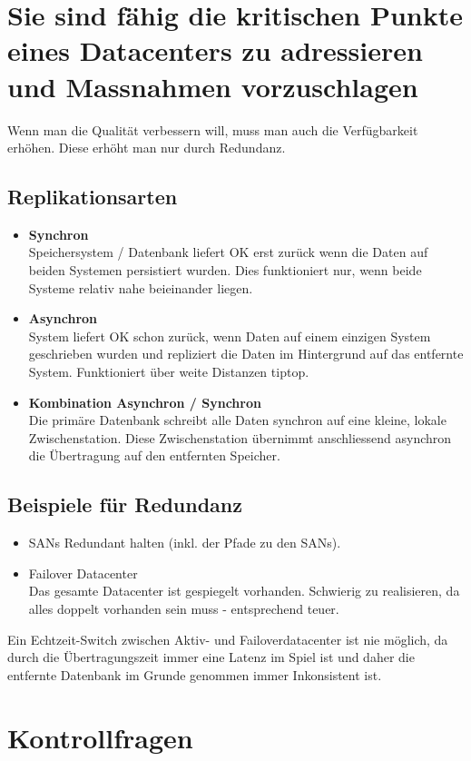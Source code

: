 \section{Sie sind fähig die kritischen Punkte eines Datacenters zu adressieren und Massnahmen vorzuschlagen}
Wenn man die Qualität verbessern will, muss man auch die Verfügbarkeit erhöhen. Diese erhöht man nur durch Redundanz.
\subsection{Replikationsarten}\label{sec:replikationsarten}
\begin{itemize}
	\item \textbf{Synchron} \\
		Speichersystem / Datenbank liefert OK erst zurück wenn die Daten auf beiden Systemen persistiert wurden. Dies funktioniert nur, wenn beide Systeme relativ nahe beieinander liegen.
	\item \textbf{Asynchron} \\
		System liefert OK schon zurück, wenn Daten auf einem einzigen System geschrieben wurden und repliziert die Daten im Hintergrund auf das entfernte System. Funktioniert über weite Distanzen tiptop.
	\item \textbf{Kombination Asynchron / Synchron} \\
		Die primäre Datenbank schreibt alle Daten synchron auf eine kleine, lokale Zwischenstation. Diese Zwischenstation übernimmt anschliessend asynchron die Übertragung auf den entfernten Speicher.
\end{itemize}
\subsection{Beispiele für Redundanz}\label{sec:bsp_redundanz}
\begin{itemize}
	\item SANs Redundant halten (inkl. der Pfade zu den SANs).
	\item Failover Datacenter \\ 
		Das gesamte Datacenter ist gespiegelt vorhanden. Schwierig zu realisieren, da alles doppelt vorhanden sein muss - entsprechend teuer.
\end{itemize}
Ein Echtzeit-Switch zwischen Aktiv- und Failoverdatacenter ist nie möglich, da durch die Übertragungszeit immer eine Latenz im Spiel ist und daher die entfernte Datenbank im Grunde genommen immer Inkonsistent ist.
\section{Kontrollfragen}
